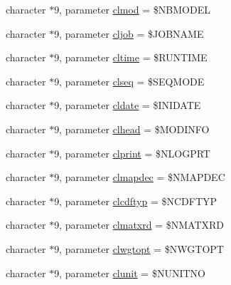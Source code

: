 \begin{DoxyCompactItemize}
\item 
character $\ast$9, parameter \hyperlink{namespacemod__oasis__namcouple_aa5cc4d0530b3e755441ef9ef70d8083b}{clmod} = \textquotesingle{}\$N\+B\+M\+O\+D\+EL \textquotesingle{}
\item 
character $\ast$9, parameter \hyperlink{namespacemod__oasis__namcouple_afbdcab2dcd637c9c70db27c8c46bd2d7}{cljob} = \textquotesingle{}\$J\+O\+B\+N\+A\+ME \textquotesingle{}
\item 
character $\ast$9, parameter \hyperlink{namespacemod__oasis__namcouple_a21a2ef5048e9fc9551821e8a0b8dec0b}{cltime} = \textquotesingle{}\$R\+U\+N\+T\+I\+ME \textquotesingle{}
\item 
character $\ast$9, parameter \hyperlink{namespacemod__oasis__namcouple_a0d0b7fa2be2a8202344c0ef9085c1309}{clseq} = \textquotesingle{}\$S\+E\+Q\+M\+O\+DE \textquotesingle{}
\item 
character $\ast$9, parameter \hyperlink{namespacemod__oasis__namcouple_a0f2d8d935f9088aec74c4dda3e9f5d9c}{cldate} = \textquotesingle{}\$I\+N\+I\+D\+A\+TE \textquotesingle{}
\item 
character $\ast$9, parameter \hyperlink{namespacemod__oasis__namcouple_a15338be5483b1b392e3e5580be75704d}{clhead} = \textquotesingle{}\$M\+O\+D\+I\+N\+FO \textquotesingle{}
\item 
character $\ast$9, parameter \hyperlink{namespacemod__oasis__namcouple_aeaab03598b6067fbecd8d8fc0c54443e}{clprint} = \textquotesingle{}\$N\+L\+O\+G\+P\+RT \textquotesingle{}
\item 
character $\ast$9, parameter \hyperlink{namespacemod__oasis__namcouple_acb6d787969090bd3c10b20775abf6531}{clmapdec} = \textquotesingle{}\$N\+M\+A\+P\+D\+EC \textquotesingle{}
\item 
character $\ast$9, parameter \hyperlink{namespacemod__oasis__namcouple_a501b430490bf3e519a11641a00f2e855}{clcdftyp} = \textquotesingle{}\$N\+C\+D\+F\+T\+YP \textquotesingle{}
\item 
character $\ast$9, parameter \hyperlink{namespacemod__oasis__namcouple_ab529642a54ad832b85c11fe4bd843314}{clmatxrd} = \textquotesingle{}\$N\+M\+A\+T\+X\+RD \textquotesingle{}
\item 
character $\ast$9, parameter \hyperlink{namespacemod__oasis__namcouple_a5ddab80f5f002c5cee81e3bbcfcda6be}{clwgtopt} = \textquotesingle{}\$N\+W\+G\+T\+O\+PT \textquotesingle{}
\item 
character $\ast$9, parameter \hyperlink{namespacemod__oasis__namcouple_a003e41234b67967593d94b3dca1a69c3}{clunit} = \textquotesingle{}\$N\+U\+N\+I\+T\+NO \textquotesingle{}

\end{DoxyCompactItemize}
